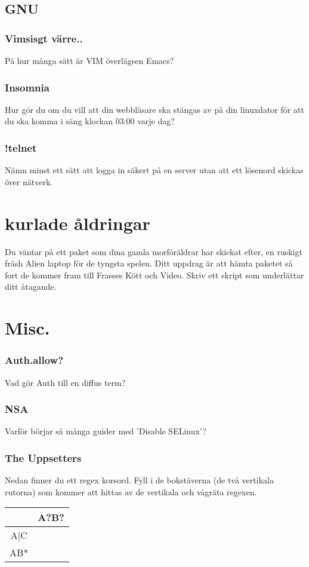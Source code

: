 \documentclass[a4paper]{report}
\begin{document}
\subsection{GNU}

\subsubsection{Vimsisgt värre..}
På hur många sätt är VIM överlägsen Emacs?

\subsubsection{Insomnia}
Hur gör du om du vill att din webbläsare ska stängas av på din linuxdator för att du ska komma i säng klockan 03:00 varje dag?

\subsubsection{!telnet}
Nämn minst ett sätt att logga in säkert på en server utan att ett lösenord skickas över nätverk.

\section{kurlade åldringar}
Du väntar på ett paket som dina gamla morföräldrar har skickat efter, en ruskigt fräsh Alien laptop för de tyngsta spelen. Ditt uppdrag är att hämta paketet så fort de kommer fram till Frasses Kött och Video. Skriv ett skript som underlättar ditt åtagande.

\section{Misc.}
\subsubsection{Auth.allow?}
Vad gör Auth till en diffus term?

\subsubsection{NSA}
Varför börjar så många guider med 'Disable SELinux'?

\subsubsection{The Uppsetters}
Nedan finner du ett regex korsord. Fyll i de bokstäverna (de två vertikala rutorna) som kommer att hittas av de vertikala och vågräta regexen.
\newline
\begin{tabular}{| c | c |}
\hline
& A?B? \\ \hline
A|C & \\ \hline
AB* & \\ \hline
\end{tabular}
\end{document}
